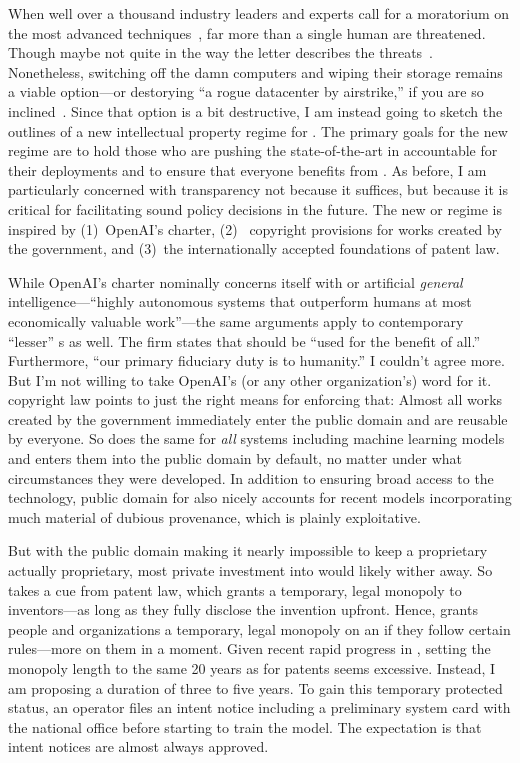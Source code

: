 When well over a thousand industry leaders and experts call for a moratorium on
the most advanced  techniques~\cite{MetzSchmidt2023}, far more than a single
human are threatened. Though maybe not quite in the way the letter describes the
threats~\cite{KapoorNarayanan2023}. Nonetheless, switching off the damn
computers and wiping their storage remains a viable option---or destorying ``a
rogue datacenter by airstrike,'' if you are so inclined~\cite{Yudkowsky2023}.
Since that option is a bit destructive, I am instead going to sketch the
outlines of a new intellectual property regime for . The primary goals for
the new  regime are to hold those who are pushing the state-of-the-art in
 accountable for their deployments and to ensure that everyone benefits from
. As before, I am particularly concerned with transparency not because it
suffices, but because it is critical for facilitating sound policy decisions in
the future. The new   or  regime is inspired by (1)~OpenAI's
charter, (2)~ copyright provisions for works created by the government, and
(3)~the internationally accepted foundations of patent law.

While OpenAI's charter nominally concerns itself with  or artificial
\emph{general} intelligence---``highly autonomous systems that outperform humans
at most economically valuable work''---the same arguments apply to contemporary
``lesser'' s as well. The firm states that  should be ``used for the
benefit of all.'' Furthermore, ``our primary fiduciary duty is to humanity.'' I
couldn't agree more. But I'm not willing to take OpenAI's (or any other
organization's) word for it.  copyright law points to just the right means
for enforcing that: Almost all works created by the government immediately enter
the public domain and are reusable by everyone. So  does the same for
\emph{all}  systems including machine learning models and enters them into
the public domain by default, no matter under what circumstances they were
developed. In addition to ensuring broad access to the technology, public domain
for  also nicely accounts for recent models incorporating much material of
dubious provenance, which is plainly exploitative.

But with the public domain making it nearly impossible to keep a proprietary
 actually proprietary, most private investment into  would likely wither
away. So  takes a cue from patent law, which grants a temporary, legal
monopoly to inventors---as long as they fully disclose the invention upfront.
Hence,  grants people and organizations a temporary, legal monopoly on an
 if they follow certain rules---more on them in a moment. Given recent rapid
progress in , setting the monopoly length to the same 20 years as for patents
seems excessive. Instead, I am proposing a duration of three to five years. To
gain this temporary protected status, an  operator files an intent notice
including a preliminary system card with the national  office before
starting to train the model. The expectation is that intent notices are almost
always approved.

